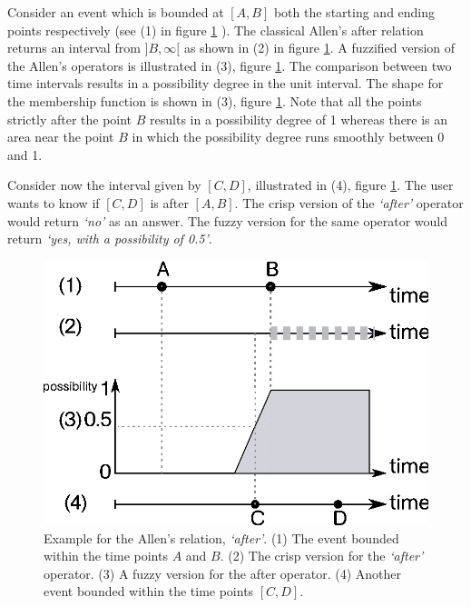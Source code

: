 \begin{example}
\label{ex:fuzzy-allen-relation}
Consider an event which is bounded at $[A,B]$ both the starting and ending points respectively (see (1) in figure \ref{fig:fuzzy-allen-relationship} ). The classical Allen's after relation returns an interval from $]B,\infty[$ as shown in (2) in figure \ref{fig:fuzzy-allen-relationship}. A fuzzified version of the Allen's operators is illustrated in (3), figure \ref{fig:fuzzy-allen-relationship}. The comparison between two time intervals results in a possibility degree in the unit interval. The shape for the membership function is shown in (3), figure \ref{fig:fuzzy-allen-relationship}. Note that all the points strictly after the point $B$ results in a possibility degree of 1 whereas there is an area near the point $B$ in which the possibility degree runs smoothly between 0 and 1. 

Consider now the interval given by $[C,D]$, illustrated in (4), figure \ref{fig:fuzzy-allen-relationship}. The user wants to know if $[C,D]$ is after $[A,B]$. The crisp version of the \emph{`after'} operator would return \emph{`no'} as an answer. The fuzzy version for the same operator would return \emph{`yes, with a possibility of 0.5'}.


\begin{figure}
\centering
\includegraphics[scale=0.5]{graphs/fuzzyAllen.eps}
\caption{Example for the Allen's relation, \emph{`after'}. (1) The event bounded within the time points $A$ and $B$. (2) The crisp version for the \emph{`after'} operator. (3) A fuzzy version for the after operator. (4) Another event bounded within the time points $[C,D]$.}
\label{fig:fuzzy-allen-relationship}
\end{figure}
\end{example}




%
%
